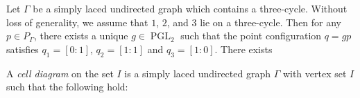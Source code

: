 \documentclass[11pt, a4paper]{amsart}
\begin{document}
	\begin{rem}
		Let $\Gamma$ be a simply laced undirected graph which contains a three-cycle. Without loss of generality, we assume that $1$, $2$, and $3$ lie on a three-cycle. 
		Then for any $p \in P_\Gamma$, there exists a unique $g \in \operatorname{PGL}_2$ such that the point configuration $q = gp$ satisfies $q_1 = [0:1]$, $q_2 = [1:1]$ and $q_3 = [1:0]$. 
		There exists 
	\end{rem}

	\begin{defn}
		A \emph{cell diagram} on the set $I$ is a simply laced undirected graph $\Gamma$ with vertex set $I$ such that the following hold:
	\end{defn}
\end{document}
